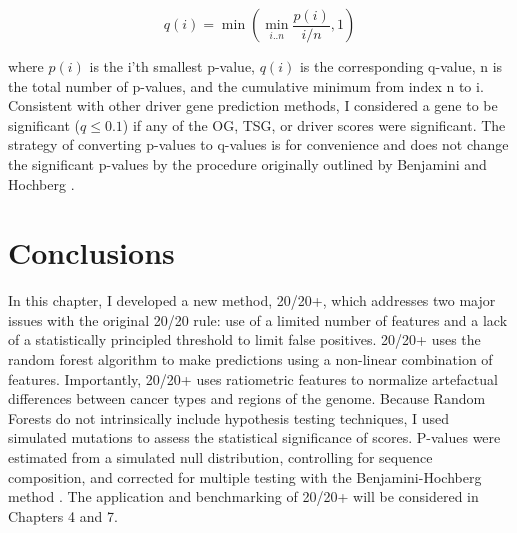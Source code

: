 \begin{equation}
q(i) = \min{\left(\min_{i..n}{\frac{p(i)}{i/n}}, 1 \right)}
\end{equation}

where $p(i)$ is the i'th smallest p-value, $q(i)$ is the corresponding q-value, n is the total number of p-values, and the cumulative minimum from index n to i. Consistent with other driver gene prediction methods, I considered a gene to be significant ($q \leq 0.1$) if any of the OG, TSG, or driver scores were significant. The strategy of converting p-values to q-values is for convenience and does not change the significant p-values by the procedure originally outlined by Benjamini and Hochberg \cite{RN94}.

\section{Conclusions}

In this chapter, I developed a new method, 20/20+, which addresses two major issues with the original 20/20 rule: use of a limited number of features and a lack of a statistically principled threshold to limit false positives. 20/20+ uses the random forest algorithm to make predictions using a non-linear combination of features. Importantly, 20/20+ uses ratiometric features to normalize artefactual differences between cancer types and regions of the genome. Because Random Forests do not intrinsically include hypothesis testing techniques, I used simulated mutations to assess the statistical significance of scores. P-values were estimated from a simulated null distribution, controlling for sequence composition, and corrected for multiple testing with the Benjamini-Hochberg method \cite{RN94}. The application and benchmarking of 20/20+ will be considered in Chapters 4 and 7.

